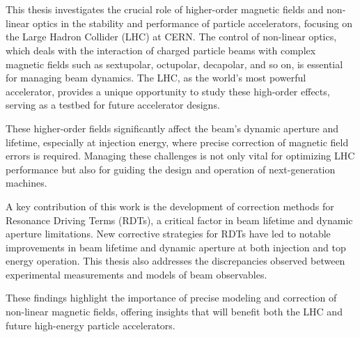 \chapter{}

\fontsize{\fontsizeabstract}{\fontskipabstract}\selectfont


This thesis investigates the crucial role of higher-order magnetic fields and non-linear optics in
the stability and performance of particle accelerators, focusing on the Large Hadron Collider (LHC)
at CERN. The control of non-linear optics, which deals with the interaction of charged particle 
beams with complex magnetic fields such as sextupolar, octupolar, decapolar, and so on, is essential
for managing beam dynamics. The LHC, as the world's most powerful accelerator, provides a unique
opportunity to study these high-order effects, serving as a testbed for future accelerator designs.

These higher-order fields significantly affect the beam's dynamic aperture and lifetime, especially
at injection energy, where precise correction of magnetic field errors is required. Managing these
challenges is not only vital for optimizing LHC performance but also for guiding the design and
operation of next-generation machines.

A key contribution of this work is the development of correction methods for Resonance Driving Terms
(RDTs), a critical factor in beam lifetime and dynamic aperture limitations. New corrective
strategies for RDTs have led to notable improvements in beam lifetime and dynamic aperture at both
injection and top energy operation. This thesis also addresses the discrepancies observed between
experimental measurements and models of beam observables.

These findings highlight the importance of precise modeling and correction of non-linear magnetic
fields, offering insights that will benefit both the LHC and future high-energy particle
accelerators.